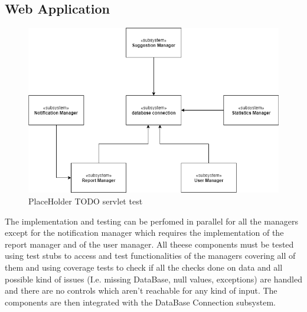 \subsection{Web Application}
\begin{figure}[H]
\centering
\includegraphics[width=\textwidth]{Images/TestServlet.png}
\caption{\label{fig:ComWI}PlaceHolder TODO servlet test}
\end{figure}
The implementation and testing can be perfomed in parallel for all the managers except for the notification manager which requires the implementation of the report manager and of the user manager. All theese components must be tested using test stubs to access and test functionalities of the managers covering all of them and using coverage tests to check if all the checks done on data and all possible kind of issues (I.e. missing DataBase, null values, exceptions) are handled and there are no controls which aren't reachable for any kind of input.
The components are then integrated with the DataBase Connection subsystem.
